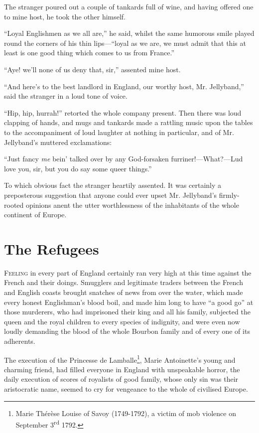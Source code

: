 \documentclass[paper=a5,BCOR=7mm,twoside,DIV=calc,12pt,usegeometry,chapterprefix,endperiod,headings=big]{scrbook}
\begin{document}
The stranger poured out a couple of tankards full of wine, and having offered one to mine host, he took the other himself.

\enquote{Loyal Englishmen as we all are,} he said, whilst the same humorous smile played round the corners of his thin lips---\enquote{loyal as we are, we must admit that this at least is one good thing which comes to us from France.}

\enquote{Aye! we'll none of us deny that, sir,} assented mine host.

\enquote{And here's to the best landlord in England, our worthy host, Mr. Jellyband,} said the stranger in a loud tone of voice.

\enquote{Hip, hip, hurrah!} retorted the whole company present. Then there was loud clapping of hands, and mugs and tankards made a rattling music upon the tables to the accompaniment of loud laughter at nothing in particular, and of Mr. Jellyband's muttered exclamations:

\enquote{Just fancy \textit{me} bein’ talked over by any God-forsaken furriner!---What?---Lud love you, sir, but you do say some queer things.}

To which obvious fact the stranger heartily assented. It was certainly a preposterous suggestion that anyone could ever upset Mr. Jellyband's firmly-rooted opinions anent the utter worthlessness of the inhabitants of the whole continent of Europe.

\chapter{The Refugees}
\lettrine[lines=4]{F}{eeling} in every part of England certainly ran very high at this time against the French and their doings. Smugglers and legitimate traders between the French and English coasts brought snatches of news from over the water, which made every honest Englishman's blood boil, and made him long to have \enquote{a good go} at those murderers, who had imprisoned their king and all his family, subjected the queen and the royal children to every species of indignity, and were even now loudly demanding the blood of the whole Bourbon family and of every one of its adherents.

The execution of the Princesse de Lamballe\footnote{Marie Thérèse Louise of Savoy (1749-1792), a victim of mob violence on September 3\textsuperscript{rd} 1792.}, Marie Antoinette's young and charming friend, had filled everyone in England with unspeakable horror, the daily execution of scores of royalists of good family, whose only sin was their aristocratic name, seemed to cry for vengeance to the whole of civilised Europe.
\end{document}
